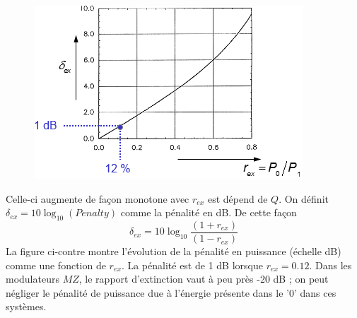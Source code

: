 \begin{figure}
\includegraphics[scale=0.6]{ch5/image20}
\end{figure}
Celle-ci augmente de façon monotone avec $r_{ex}$ est dépend de $Q$. On définit ${\delta _{ex}} 
= 10{\log _{10}}\left( {Penalty} \right)$ comme la pénalité en dB. De cette façon
\begin{equation}
{\delta _{ex}} = 10{\log _{10}}\frac{{\left( {1 + {r_{ex}}} \right)}}{{\left( {1 - {r_{ex}}} \right)}}
\end{equation}
La figure ci-contre montre l'évolution de la pénalité en puissance (échelle dB) comme une fonction 
de $r_{ex}$. La pénalité est de 1 dB lorsque $r_{ex}=0.12$. Dans les modulateurs $MZ$, le rapport
d'extinction vaut à peu près -20 dB ; on peut négliger le pénalité de puissance due à l'énergie 
présente dans le '0' dans ces systèmes. 


